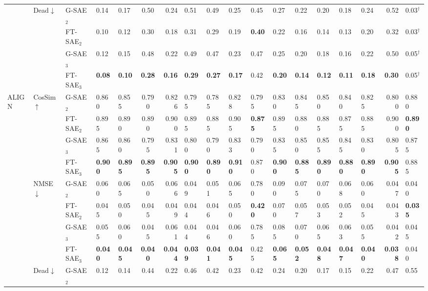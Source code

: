 \begin{table}[tbp]
{\begin{tabular}{lll A B C D E F G H I J K L M N O}
  \cmidrule(l){2-18}
  & Dead$\downarrow$
    & G-SAE$_2$  & 0.14 & 0.17 & 0.50 & 0.24 & 0.51 & 0.49 & 0.25 & 0.45 & 0.27 & 0.22 & 0.20 & 0.18 & 0.24 & 0.52 & 0.03$^\dagger$ \\
  & & FT-SAE$_2$ & 0.10 & 0.12 & 0.30 & 0.18 & 0.31 & 0.29 & 0.19 & \bf0.40 & 0.22 & 0.16 & 0.14 & 0.13 & 0.20 & 0.32 & 0.03$^\dagger$ \\
  & & G-SAE$_3$  & 0.12 & 0.15 & 0.48 & 0.22 & 0.49 & 0.47 & 0.23 & 0.47 & 0.25 & 0.20 & 0.18 & 0.16 & 0.22 & 0.50 & 0.05$^\dagger$ \\
  & & FT-SAE$_3$ & \bf0.08 & \bf0.10 & \bf0.28 & \bf0.16 & \bf0.29 & \bf0.27 & \bf0.17 & 0.42 & \bf0.20 & \bf0.14 & \bf0.12 & \bf0.11 & \bf0.18 & \bf0.30 & 0.05$^\dagger$ \\
\midrule
ALIGN
  & CosSim$\uparrow$
    & G-SAE$_2$  & 0.860 & 0.855 & 0.790 & 0.826 & 0.795 & 0.785 & 0.828 & 0.795 & 0.830 & 0.845 & 0.850 & 0.840 & 0.825 & 0.800 & 0.880 \\
  & & FT-SAE$_2$ & 0.895 & 0.890 & 0.890 & 0.900 & 0.895 & 0.885 & 0.905 & \bf0.875 & 0.895 & 0.880 & 0.885 & 0.875 & 0.885 & 0.900 & \bf0.890 \\
  & & G-SAE$_3$  & 0.865 & 0.860 & 0.795 & 0.831 & 0.800 & 0.790 & 0.833 & 0.790 & 0.835 & 0.850 & 0.855 & 0.845 & 0.830 & 0.805 & 0.875 \\
  & & FT-SAE$_3$ & \bf0.900 & \bf0.895 & \bf0.895 & \bf0.905 & \bf0.900 & \bf0.890 & \bf0.910 & 0.870 & \bf0.900 & \bf0.885 & \bf0.890 & \bf0.880 & \bf0.890 & \bf0.905 & 0.885 \\
  \cmidrule(l){2-18}
  & NMSE$\downarrow$
    & G-SAE$_2$  & 0.060 & 0.065 & 0.050 & 0.066 & 0.049 & 0.051 & 0.065 & 0.780 & 0.090 & 0.075 & 0.070 & 0.068 & 0.060 & 0.047 & 0.040 \\
  & & FT-SAE$_2$ & 0.045 & 0.050 & 0.045 & 0.049 & 0.044 & 0.046 & 0.050 & \bf0.420 & 0.070 & 0.057 & 0.053 & 0.052 & 0.045 & 0.043 & \bf0.035 \\
  & & G-SAE$_3$  & 0.055 & 0.060 & 0.045 & 0.061 & 0.044 & 0.046 & 0.060 & 0.785 & 0.085 & 0.070 & 0.065 & 0.063 & 0.055 & 0.042 & 0.045 \\
  & & FT-SAE$_3$ & \bf0.040 & \bf0.045 & \bf0.040 & \bf0.044 & \bf0.039 & \bf0.041 & \bf0.045 & 0.425 & \bf0.065 & \bf0.052 & \bf0.048 & \bf0.047 & \bf0.040 & \bf0.038 & 0.040 \\
  \cmidrule(l){2-18}
  & Dead$\downarrow$
    & G-SAE$_2$  & 0.12 & 0.14 & 0.44 & 0.22 & 0.46 & 0.42 & 0.23 & 0.42 & 0.24 & 0.20 & 0.17 & 0.15 & 0.22 & 0.47 & 0.55 \\

\end{tabular}}
\end{table}
